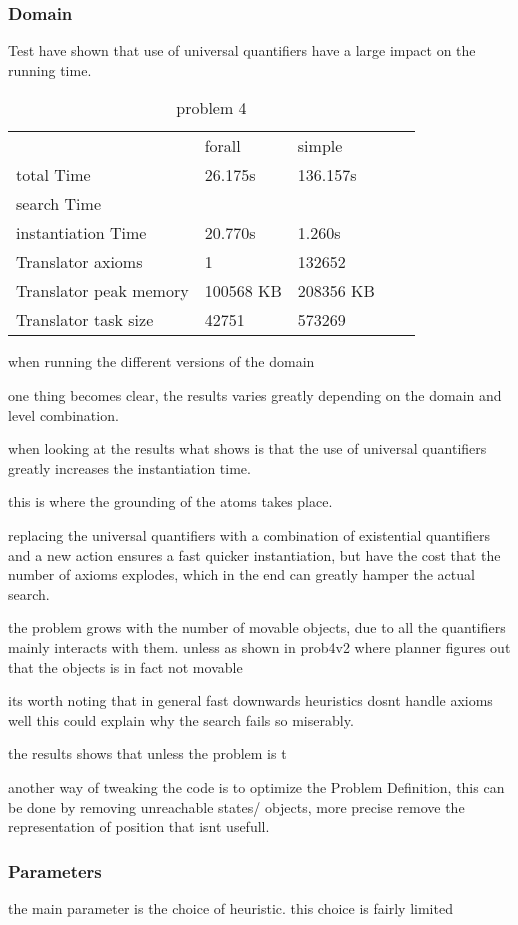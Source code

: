 	\subsubsection{Domain}
	Test have shown that use of universal quantifiers have a large impact on the running time. 
	\begin{table}
		\centering
		\caption{problem 4}
		\label{my-label}
		\begin{tabular}{lllll}
			 & forall & simple  \\
			total Time& 26.175s & 136.157s \\
			search Time&  &  \\
			instantiation Time &20.770s  &1.260s \\
			Translator axioms & 1 & 132652 \\ 
			Translator peak memory & 100568 KB & 208356 KB\\ 
			Translator task size & 42751 & 573269\\
		\end{tabular}
	\end{table}

	when running the different versions of the domain


	one thing becomes clear, the results varies greatly depending on the domain and level combination.

	when looking at the results what shows is that the use of universal quantifiers greatly increases the instantiation time.

	this is where the grounding of the atoms takes place.

	replacing the universal quantifiers with a combination of existential quantifiers and a new action ensures a fast quicker instantiation, but have the cost that the number of axioms explodes, which in the end can greatly hamper the actual search.
	
	the problem grows with the number of movable objects, due to all the quantifiers mainly interacts with them. unless as shown in prob4v2 where planner figures out that the objects is in fact not movable
	
	its worth noting that in general fast downwards heuristics dosnt handle axioms well %
	this could explain why the search fails so miserably. 
	
		
	the results shows that unless the problem is t
	


	
	
	another way of tweaking the code is to optimize the Problem Definition, this can be done by removing unreachable states/ objects, more precise remove the representation of position that isnt usefull.
	
	
	

	\subsubsection{Parameters}
	the main parameter is the choice of heuristic. this choice is fairly limited 
	

	
	
